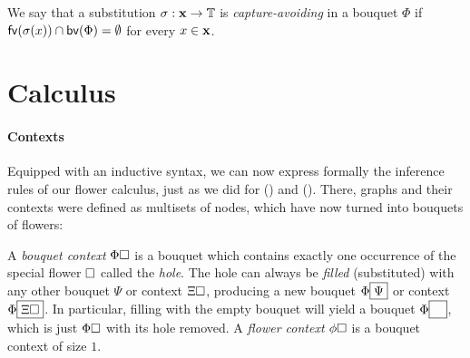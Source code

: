 \begin{definition}
  We say that a substitution $\sigma : \mathbf{x} \to \mathbb{T}$ is
  \emph{capture-avoiding} in a bouquet $\Phi$ if $\mathsf{fv}(\sigma(x)) \cap \mathsf{bv}(\Phi)
  = \emptyset$ for every $x \in \mathbf{x}$.
\end{definition}

\section{Calculus}

\paragraph{Contexts}

Equipped with an inductive syntax, we can now express formally the inference
rules of our flower calculus, just as we did for 
() and  (). There, graphs and their
contexts were defined as multisets of nodes, which have now turned into bouquets
of flowers:

\begin{definition}[Context]
  A \emph{bouquet context} $\Phi\square$ is a bouquet which contains exactly one
  occurrence of the special flower $\square$ called the \emph{hole}. The hole can
  always be \emph{filled} (substituted) with any other bouquet $\Psi$ or context
  $\Xi\square$, producing a new bouquet $\Phi\fbox{$\Psi$}$ or context
  $\Phi\fbox{$\Xi\square$}$. In particular, filling with the empty bouquet will
  yield a bouquet $\Phi\fbox{$\phantom{\Phi}$}$, which is just $\Phi\square$ with
  its hole removed. A \emph{flower context} $\phi\square$ is a bouquet context of
  size $1$.
\end{definition}

